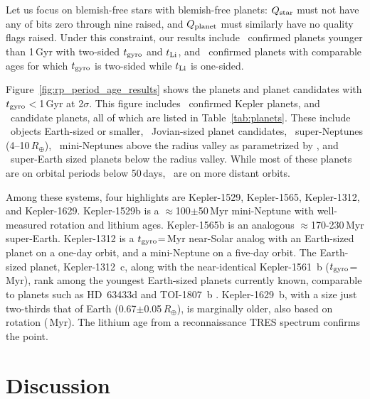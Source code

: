 \documentclass[11pt,twocolumn,tighten,linenumbers]{aastex63}
\begin{document}
Let us focus on blemish-free stars with blemish-free planets: $Q_{\rm
star}$ must not have any of bits zero through nine raised, and $Q_{\rm
planet}$ must similarly have no quality flags raised.  Under this
constraint, our results include \ltonegyrhighqconfirmedtwosided\
confirmed planets younger than 1\,Gyr with two-sided $t_{\rm gyro}$
and $t_{\rm Li}$, and \ltonegyrhighqconfirmedonesided\ confirmed
planets with comparable ages for which $t_{\rm gyro}$ is two-sided
while $t_{\rm Li}$ is one-sided.

Figure~\ref{fig:rp_period_age_results} shows the planets and planet
candidates with $t_{\rm gyro}$$<$1\,Gyr at 2$\sigma$.  This figure
includes \nconfirmedplyounggyrotwosigmanograzingnoruwe\ confirmed
Kepler planets, and \ncandidateplyounggyrotwosigmanograzingnoruwe\
candidate planets, all of which are listed in Table~\ref{tab:planets}.
These include \nearthshighq\ objects Earth-sized or smaller,
\njupitershighq\ Jovian-sized planet candidates, \nsubsaturnshighq\
super-Neptunes (4--10\,$R_\oplus$), \nminineptuneshighq\ mini-Neptunes
above the radius valley as parametrized by
\citealt{2018MNRAS.479.4786V}, and \nsuperearthshighq\ super-Earth
sized planets below the radius valley.  While most of these planets
are on orbital periods below 50\,days, \nlongperiodhighq\ are on more
distant orbits.

Among these systems, four highlights are Kepler-1529, Kepler-1565,
Kepler-1312, and Kepler-1629.  Kepler-1529b is a
$\approx$100$\pm$50\,Myr mini-Neptune with well-measured rotation and
lithium ages.  Kepler-1565b is an analogous $\approx$170-230\,Myr
super-Earth.  Kepler-1312 is a $t_{\rm gyro}$=\kepthirteentwelve\,Myr
near-Solar analog with an Earth-sized planet on a one-day orbit, and a
mini-Neptune on a five-day orbit.  The Earth-sized planet,
Kepler-1312~c, along with the near-identical Kepler-1561~b ($t_{\rm
gyro}$=\kepfifteensixone\,Myr), rank among the youngest Earth-sized
planets currently known, comparable to planets such as HD~63433d
\citep[1.1\,$R_\oplus$, $414$$\pm$$23$\,Myr;][]{2024AJ....167...54C}
and TOI-1807~b \citep[1.3\,$R_\oplus$,
180$\pm$40\,Myr;][]{2021AJ....162...54H}.  Kepler-1629~b, with a size
just two-thirds that of Earth (0.67$\pm$0.05\,$R_\oplus$), is
marginally older, also based on rotation (\kepsixteentwonine\,Myr).
The lithium age from a reconnaissance TRES spectrum confirms the
point.


\section{Discussion}
\label{sec:disc}
\end{document}
